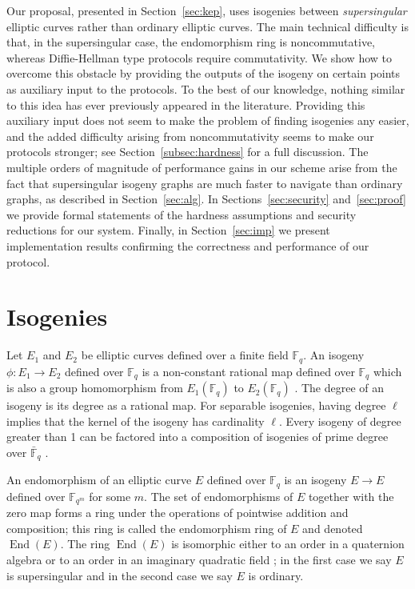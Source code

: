 \documentclass[jmc]{degruyter-journal-a}
\theoremstyle{definition}
\newcommand{\FF}{{\mathbb{F}}}
\newcommand{\End}{\operatorname{End}}
\begin{document}
Our proposal, presented in Section~\ref{sec:kep}, uses isogenies
between \emph{supersingular} elliptic curves rather than ordinary
elliptic curves. The main technical difficulty is that, in the
supersingular case, the endomorphism ring is noncommutative, whereas
Diffie-Hellman type protocols require commutativity. We show how to
overcome this obstacle by providing the outputs of the isogeny on
certain points as auxiliary input to the protocols. To the best of our
knowledge, nothing similar to this idea has ever previously appeared
in the literature. Providing this auxiliary input does not seem to
make the problem of finding isogenies any easier, and the added
difficulty arising from noncommutativity seems to make our protocols
stronger; see Section~\ref{subsec:hardness} for a full discussion. The
multiple orders of magnitude of performance gains in our scheme arise
from the fact that supersingular isogeny graphs are much faster to
navigate than ordinary graphs, as described in
Section~\ref{sec:alg}. In Sections~\ref{sec:security}
and~\ref{sec:proof} we provide formal statements of the hardness
assumptions and security reductions for our system. Finally, in
Section~\ref{sec:imp} we present implementation results confirming the
correctness and performance of our protocol.


\section{Isogenies}\label{isogenies}
Let $E_1$ and $E_2$ be elliptic curves defined over a finite field
$\FF_q$.
An isogeny $\phi: E_1 \rightarrow E_2$ defined over $\FF_q$ is a
non-constant rational map defined over $\FF_q$ which is also a group
homomorphism from $E_1(\FF_q)$ to $E_2(\FF_q)$ \cite[III.4]{Sil}. The
degree of an isogeny is its degree as a rational map.  For separable
isogenies, having degree $\ell$ implies that the kernel of the
isogeny has cardinality $\ell$.
Every isogeny of degree greater than 1 can be factored into a
composition of isogenies of prime degree over $\bar{\FF}_q$
\cite{Couv}.

An endomorphism of an elliptic curve $E$ defined over $\FF_q$ is an
isogeny $E \rightarrow E$ defined over $\FF_{q^m}$ for some $m$. The
set of endomorphisms of $E$ together with the zero map forms a ring
under the operations of pointwise addition and composition; this ring
is called the endomorphism ring of $E$ and denoted $\End(E)$. The ring
$\End(E)$ is isomorphic either to an order in a quaternion algebra or
to an order in an imaginary quadratic field \cite[V.3.1]{Sil}; in the
first case we say $E$ is supersingular and in the second case we say
$E$ is ordinary.
\end{document}
